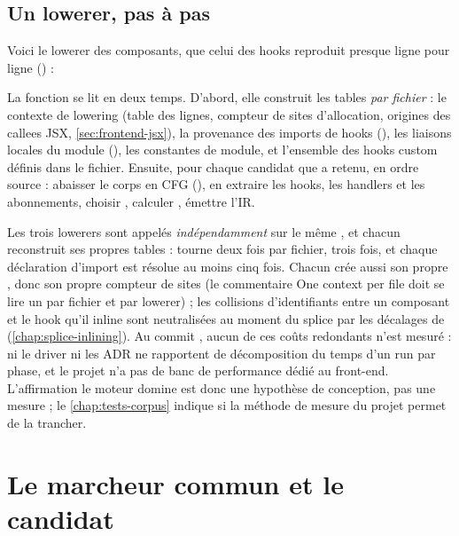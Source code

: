 \subsection{Un lowerer, pas à pas}

Voici le lowerer des composants, que celui des hooks reproduit presque ligne pour ligne () :


La fonction se lit en deux temps. D'abord, elle construit les tables \emph{par fichier} : le contexte de lowering  (table des lignes, compteur de sites d'allocation, origines des callees JSX, \cref{sec:frontend-jsx}), la provenance des imports de hooks (), les liaisons locales du module  (), les constantes de module, et l'ensemble  des hooks custom définis dans le fichier. Ensuite, pour chaque candidat que  a retenu, en ordre source : abaisser le corps en CFG (), en extraire les hooks, les handlers et les abonnements, choisir , calculer , émettre l'IR.

\begin{remarque}
Les trois lowerers sont appelés \emph{indépendamment} sur le même , et chacun reconstruit ses propres tables :  tourne deux fois par fichier,  trois fois, et chaque déclaration d'import est résolue au moins cinq fois. Chacun crée aussi son propre , donc son propre compteur de sites (le commentaire \og One context per file\fg{} doit se lire \og un par fichier et par lowerer\fg{}) ; les collisions d'identifiants entre un composant et le hook qu'il inline sont neutralisées au moment du splice par les décalages de  (\cref{chap:splice-inlining}). Au commit \snapshotCommit{}, aucun de ces coûts redondants n'est mesuré : ni le driver ni les ADR ne rapportent de décomposition du temps d'un run par phase, et le projet n'a pas de banc de performance dédié au front-end. L'affirmation \og le moteur domine\fg{} est donc une hypothèse de conception, pas une mesure ; le \cref{chap:tests-corpus} indique si la méthode de mesure du projet permet de la trancher.
\end{remarque}

\section{Le marcheur commun et le candidat}
\label{sec:frontend-marcheur}

